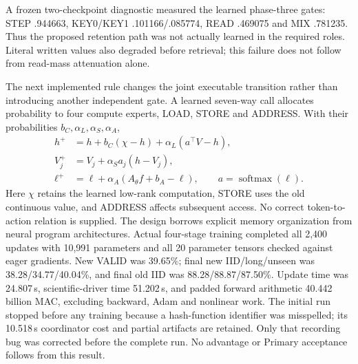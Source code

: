 A frozen two-checkpoint diagnostic measured the learned phase-three gates:
STEP .944663, KEY0/KEY1 .101166/.085774, READ .469075 and MIX .781235.
Thus the proposed retention path was not actually learned in the required
roles. Literal written values also degraded before retrieval; this failure
does not follow from read-mass attenuation alone.

The next implemented rule changes the joint executable
transition rather than introducing another independent gate. A learned
seven-way call allocates probability to four compute experts, LOAD, STORE
and ADDRESS. With their probabilities $b_C,\alpha_L,\alpha_S,\alpha_A$,
\begin{align}
h^+&=h+b_C(\chi-h)+\alpha_L(a^\top V-h),\\
V_j^+&=V_j+\alpha_Sa_j(h-V_j),\\
\ell^+&=\ell+\alpha_A(A_\theta f+b_A-\ell),\qquad a=\operatorname{softmax}(\ell).
\end{align}
Here $\chi$ retains the learned low-rank computation, STORE uses the old
continuous value, and ADDRESS affects subsequent access. No correct
token-to-action relation is supplied. The design borrows explicit memory
organization from neural program architectures. Actual four-stage training
completed all 2,400 updates with 10,991 parameters and all 20 parameter
tensors checked against eager gradients. New VALID was 39.65\%; final
new IID/long/unseen was 38.28/34.77/40.04\%, and final old IID was
88.28/88.87/87.50\%. Update time was 24.807\,s, scientific-driver time
51.202\,s, and padded forward arithmetic 40.442 billion MAC, excluding
backward, Adam and nonlinear work. The initial run stopped before any
training because a hash-function identifier was misspelled; its 10.518\,s
coordinator cost and partial artifacts are retained. Only that recording
bug was corrected before the complete run. No advantage or Primary
acceptance follows from this result.

